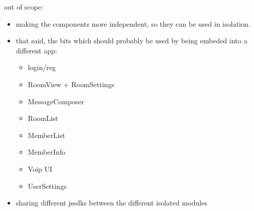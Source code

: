\documentclass[letterpaper,10pt,openany,oneside,english]{sphinxmanual}
\begin{document}
\sphinxAtStartPar
out of scope:
\begin{itemize}
\item {} 
\sphinxAtStartPar
making the components more independent, so they can be used in isolation.

\item {} 
\sphinxAtStartPar
that said, the bits which should probably be used by being embeded into a different app:
\begin{itemize}
\item {} 
\sphinxAtStartPar
login/reg

\item {} 
\sphinxAtStartPar
RoomView + RoomSettings

\item {} 
\sphinxAtStartPar
MessageComposer

\item {} 
\sphinxAtStartPar
RoomList

\item {} 
\sphinxAtStartPar
MemberList

\item {} 
\sphinxAtStartPar
MemberInfo

\item {} 
\sphinxAtStartPar
Voip UI

\item {} 
\sphinxAtStartPar
UserSettings

\end{itemize}

\item {} 
\sphinxAtStartPar
sharing different js\sphinxhyphen{}sdks between the different isolated modules

\end{itemize}
\end{document}
